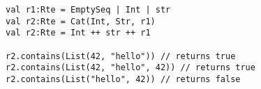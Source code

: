 \begin{lstlisting}[style=reclojureScala]
val r1:Rte = EmptySeq | Int | str
val r2:Rte = Cat(Int, Str, r1)
val r2:Rte = Int ++ str ++ r1

r2.contains(List(42, "hello")) // returns true
r2.contains(List(42, "hello", 42)) // returns true
r2.contains(List("hello", 42)) // returns false
\end{lstlisting}
